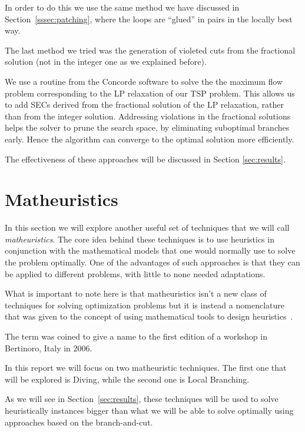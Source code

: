 \documentclass{article}
\begin{document}
In order to do this we use the same method we have discussed in Section~\ref{sssec:patching}, where
the loops are ``glued'' in pairs in the locally best way.

The last method we tried was the generation of violeted cuts from the fractional solution
(not in the integer one as we explained before).

We use a routine from the Concorde software to solve the the maximum flow problem
corresponding to the LP relaxation of our TSP problem. This allows us to
add SECs derived from the fractional solution of the LP relaxation, rather than from the integer solution.
Addressing violations in the fractional solutions helps the solver to prune the search space, by eliminating
suboptimal branches early. Hence the algorithm can converge to the optimal solution more efficiently.

The effectiveness of these approaches will be discussed in Section \ref{sec:results}.
\newpage

\section{Matheuristics}
In this section we will explore another useful set of techniques that we will call
\textit{matheuristics}.
The core idea behind these techniques is to use heuristics in conjunction with the
mathematical models that one would normally use to solve the problem optimally.
One of the advantages of such approaches is that they can be applied to different problems,
with little to none needed adaptations.

What is important to note here is that matheuristics isn't a new class of techniques
for solving optimization problems but it is instead a nomenclature that was given
to the concept of using mathematical tools to design heuristics~\cite{boschetti2022matheuristics}.

The term was coined to give a name to the first edition of a workshop in Bertinoro, Italy
in 2006.

In this report we will focus on two matheuristic techniques.
The first one that will be explored is Diving, while the second one is Local Branching.

As we will see in Section~\ref{sec:results}, these techniques will be used to solve
heuristically instances bigger than what we will be able to solve optimally using approaches
based on the branch-and-cut.
\end{document}
